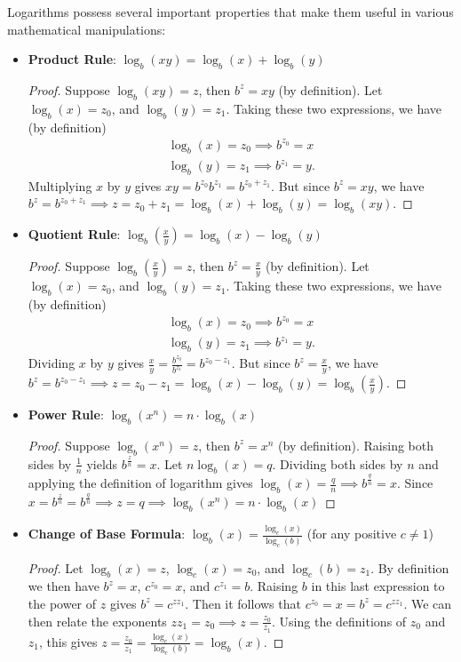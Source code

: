 Logarithms possess several important properties that make them useful in various mathematical manipulations:

\begin{itemize}
	\item \textbf{Product Rule}: $\log_b(xy) = \log_b(x) + \log_b(y)$
 	\begin{proof}
		Suppose $\log_b(xy) = z$, then $b^z = xy$ (by definition). Let $\log_b(x)=z_0$, and $\log_b(y) = z_1$. Taking these two expressions, we have (by definition)
		\begin{align}
		\log_b(x)=z_0 \implies b^{z_0} = x \\
		\log_b(y)=z_1 \implies b^{z_1} = y.
		\end{align}
		Multiplying $x$ by $y$ gives $xy = b^{z_0}b^{z_1} = b^{z_0+z_1}$. But since $b^z=xy$, we have $b^z = b^{z_0+z_1} \implies z = z_0+z_1 = \log_b(x) + \log_b(y) = \log_b(xy)$.
	\end{proof}
	\item \textbf{Quotient Rule}: $\log_b\left(\frac{x}{y}\right) = \log_b(x) - \log_b(y)$
 	\begin{proof}
		Suppose $\log_b\left(\frac{x}{y}\right) = z$, then $b^z = \frac{x}{y}$ (by definition). Let $\log_b(x)=z_0$, and $\log_b(y) = z_1$. Taking these two expressions, we have (by definition)
		\begin{align}
		\log_b(x)=z_0 \implies b^{z_0} = x \\
		\log_b(y)=z_1 \implies b^{z_1} = y.
		\end{align}
		Dividing $x$ by $y$ gives $\frac{x}{y} = \frac{b^{z_0}}{b^{z_1}} = b^{z_0-z_1}$. But since $b^z=\frac{x}{y}$, we have $b^z = b^{z_0-z_1} \implies z = z_0-z_1 = \log_b(x) - \log_b(y) = \log_b\left(\frac{x}{y}\right)$.
	\end{proof}
	\item \textbf{Power Rule}: $\log_b(x^n) = n \cdot \log_b(x)$
 	\begin{proof}
		Suppose $\log_b(x^n) = z$, then $b^z = x^n$ (by definition). Raising both sides by $\frac{1}{n}$ yields $b^{\frac{z}{n}}=x$. Let $n\log_b(x)=q$. Dividing both sides by $n$ and applying the definition of logarithm gives $\log_b(x) = \frac{q}{n}\implies b^{\frac{q}{n}} = x$. Since $x=b^{\frac{z}{n}} = b^{\frac{q}{n}} \implies z=q \implies \log_b(x^n) = n \cdot \log_b(x)$
	\end{proof}
	\item \textbf{Change of Base Formula}: $\log_b(x) = \frac{\log_c(x)}{\log_c(b)}$ (for any positive $c \neq 1$)
	\begin{proof}
		Let $\log_b(x) = z$, $\log_c(x) = z_0$, and $\log_c(b) = z_1$. By definition we then have $b^z = x$, $c^{z_0} = x$, and $c^{z_1} = b$. Raising $b$ in this last expression to the power of $z$ gives $b^z = c^{zz_1}$. Then it follows that $c^{z_0} = x = b^z = c^{zz_1}$. We can then relate the exponents $zz_1=z_0 \implies z = \frac{z_0}{z_1}$. Using the definitions of $z_0$ and $z_1$, this gives $z = \frac{z_0}{z_1} = \frac{\log_c(x)}{\log_c(b)} = \log_b(x)$.
	\end{proof}
\end{itemize}
